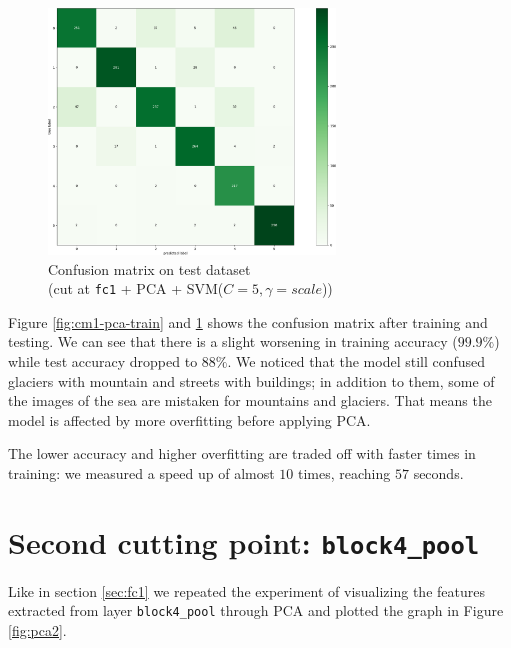 \documentclass[compsoc]{IEEEtran}
\begin{document}
\begin{figure}[ht!]
\centering                                                                        
\includegraphics[width=3in]{../images/cm1-pca-test.png}
\captionsetup{justification=centering}                                                                                         
\caption{Confusion matrix on test dataset \\ (cut at \texttt{fc1} + PCA + SVM($C=5, \gamma=scale$))}
\label{fig:cm1-pca-test}                                                                                                                               
\end{figure}
Figure \ref{fig:cm1-pca-train} and \ref{fig:cm1-pca-test} shows the confusion matrix after training and testing. We can see that there is a slight worsening in training accuracy ($99.9\%$) while test accuracy dropped to $88\%$. We noticed that the model still confused glaciers with mountain and streets with buildings; in addition to them, some of the images of the sea are mistaken for mountains and glaciers. That means the model is affected by more overfitting before applying PCA. \par
The lower accuracy and higher overfitting are traded off with faster times in training: we measured a speed up of almost $10$ times, reaching $57$ seconds.












\section{Second cutting point: \texttt{block4\_pool}}


Like in section \ref{sec:fc1} we repeated the experiment of visualizing the features extracted from layer \texttt{block4\_pool} through PCA and plotted the graph in Figure \ref{fig:pca2}.
\end{document}
